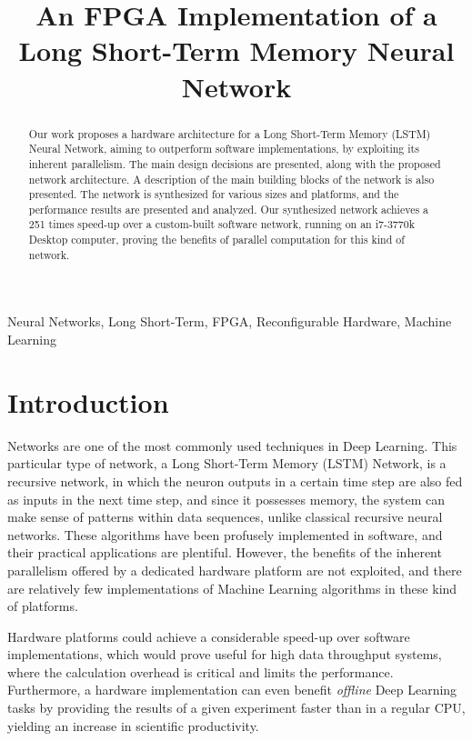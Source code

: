 \documentclass{IEEEtran}
\title{An FPGA Implementation of a Long Short-Term Memory Neural Network}
\begin{document}
\maketitle

\begin{abstract}
Our work proposes a hardware architecture for a Long Short-Term Memory (LSTM) Neural Network, aiming
to outperform software implementations, by exploiting its inherent parallelism.
The main design decisions are presented, along with the proposed network architecture. A description of the main
building blocks of the network is also presented. The network is synthesized for various sizes and platforms,
and the performance results are presented and analyzed. Our synthesized network achieves a 251 times speed-up
over a custom-built software network, running on an i7-3770k Desktop computer, proving the benefits of parallel computation
for this kind of network.
\end{abstract}

\begin{IEEEkeywords}
Neural Networks, Long Short-Term, FPGA, Reconfigurable Hardware, Machine Learning
\end{IEEEkeywords}

\section{Introduction}\label{sec:intro}
 Networks are one of the most commonly used techniques in Deep Learning. This
particular type of network, a Long Short-Term Memory (LSTM) Network, is a recursive network, in which the neuron outputs in a certain
time step are also fed as inputs in the next time step, and since it possesses memory, the system can make
sense of patterns within data sequences, unlike classical recursive neural networks.
These algorithms have been profusely implemented in software, and their practical applications are plentiful.
However, the benefits of the inherent parallelism offered by a dedicated hardware
platform are not exploited, and there are relatively few implementations of Machine Learning algorithms in
these kind of platforms.

Hardware platforms could achieve a considerable speed-up over software implementations, which would prove
useful for high data throughput systems, where the calculation overhead is critical and limits the performance.
Furthermore, a hardware implementation can even benefit \emph{offline} Deep Learning tasks by providing the results
of a given experiment faster than in a regular CPU, yielding an increase in scientific productivity.
\end{document}
